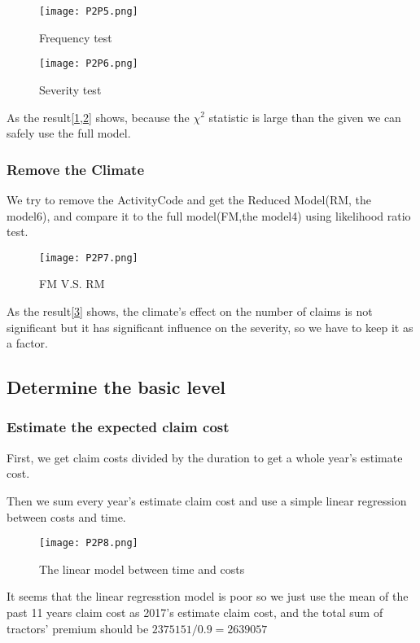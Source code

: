 \documentclass[11pt]{article}
\begin{document}
\begin{figure}[!htb]
\centering
\texttt{[image: P2P5.png]}
\caption{Frequency test}\label{Fig5}
\end{figure}

\begin{figure}[!htb]
\centering
\texttt{[image: P2P6.png]}
\caption{Severity test}\label{Fig6}
\end{figure}


As the result[\ref{Fig5},\ref{Fig6}] shows, because the $\chi^2$ statistic is large than the given we can safely use the full model.

\subsubsection{Remove the Climate}

We try to remove the ActivityCode and get the Reduced Model(RM, the model6), and compare it to the full model(FM,the model4) using likelihood ratio test.

\begin{figure}[!htb]
\centering
\texttt{[image: P2P7.png]}
\caption{FM V.S. RM}\label{Fig7}
\end{figure}

As the result[\ref{Fig7}] shows, the climate's effect on the number of claims is not significant but it has significant influence on the severity, so we have to keep it as a factor.

\subsection{Determine the basic level}

\subsubsection{Estimate the expected claim cost}
First, we get claim costs divided by the duration to get a whole year's estimate cost.


Then we sum every year's estimate claim cost and use a simple linear regression between costs and time.

\begin{figure}[!htb]
\centering
\texttt{[image: P2P8.png]}
\caption{The linear model between time and costs}
\label{Fig8}
\end{figure}

It seems that the linear regresstion model is poor so we just use the mean of the past 11 years claim cost as 2017's estimate claim cost, and the total sum of tractors’ premium should be $2375151/0.9=2639057$
\end{document}
